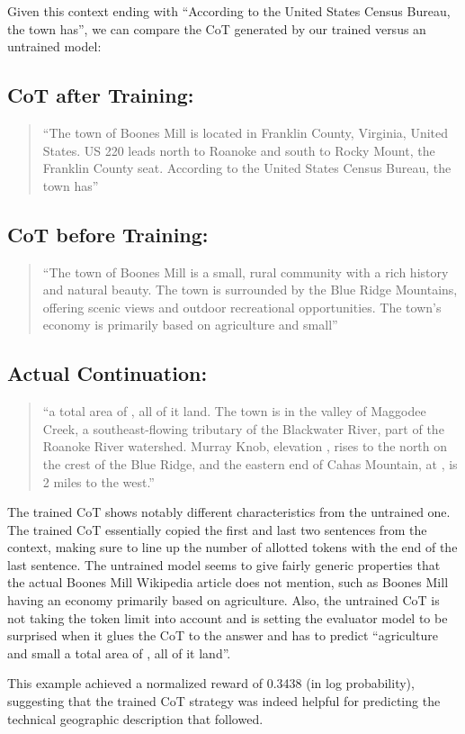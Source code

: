 \documentclass{article}
\theoremstyle{plain}
\theoremstyle{definition}
\theoremstyle{remark}
\begin{document}
Given this context ending with ``According to the United States Census Bureau, the town has'', we can compare the CoT generated by our trained versus an untrained model:

\subsection{CoT after Training:}
\begin{quote}
``The town of Boones Mill is located in Franklin County, Virginia, United States. US 220 leads north to Roanoke and south to Rocky Mount, the Franklin County seat. According to the United States Census Bureau, the town has''
\end{quote}

\subsection{CoT before Training:}
\begin{quote}
``The town of Boones Mill is a small, rural community with a rich history and natural beauty. The town is surrounded by the Blue Ridge Mountains, offering scenic views and outdoor recreational opportunities. The town's economy is primarily based on agriculture and small''
\end{quote}

\subsection{Actual Continuation:}
\begin{quote}
``a total area of , all of it land. The town is in the valley of Maggodee Creek, a southeast-flowing tributary of the Blackwater River, part of the Roanoke River watershed. Murray Knob, elevation , rises  to the north on the crest of the Blue Ridge, and the eastern end of Cahas Mountain, at , is 2 miles to the west.''
\end{quote}

The trained CoT shows notably different characteristics from the untrained one. The trained CoT essentially copied the first and last two sentences from the context, making sure to line up the number of allotted tokens with the end of the last sentence. The untrained model seems to give fairly generic properties that the actual Boones Mill Wikipedia article does not mention, such as Boones Mill having an economy primarily based on agriculture. Also, the untrained CoT is not taking the token limit into account and is setting the evaluator model to be surprised when it glues the CoT to the answer and has to predict ``agriculture and small a total area of , all of it land''.

This example achieved a normalized reward of 0.3438 (in log probability), suggesting that the trained CoT strategy was indeed helpful for predicting the technical geographic description that followed.
\end{document}
